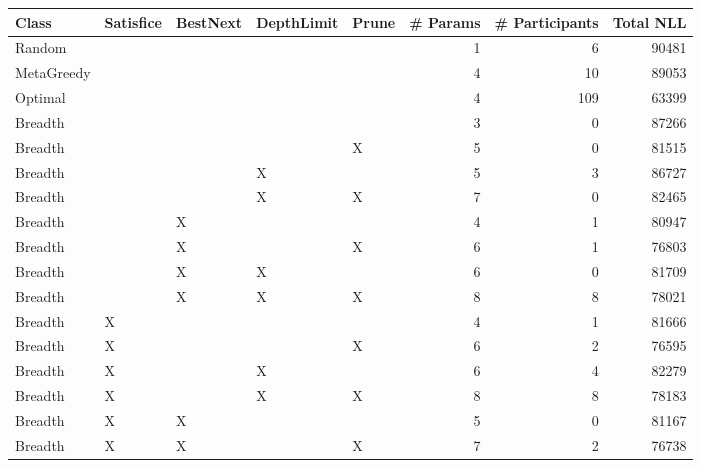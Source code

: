 \begin{tabular}{lllllrrr}
\toprule
      Class & Satisfice & BestNext & DepthLimit & Prune &  \# Params &  \# Participants &  Total NLL \\
\midrule
     Random &           &          &            &       &         1 &               6 &      90481 \\
 MetaGreedy &           &          &            &       &         4 &              10 &      89053 \\
    Optimal &           &          &            &       &         4 &             109 &      63399 \\
    Breadth &           &          &            &       &         3 &               0 &      87266 \\
    Breadth &           &          &            &     X &         5 &               0 &      81515 \\
    Breadth &           &          &          X &       &         5 &               3 &      86727 \\
    Breadth &           &          &          X &     X &         7 &               0 &      82465 \\
    Breadth &           &        X &            &       &         4 &               1 &      80947 \\
    Breadth &           &        X &            &     X &         6 &               1 &      76803 \\
    Breadth &           &        X &          X &       &         6 &               0 &      81709 \\
    Breadth &           &        X &          X &     X &         8 &               8 &      78021 \\
    Breadth &         X &          &            &       &         4 &               1 &      81666 \\
    Breadth &         X &          &            &     X &         6 &               2 &      76595 \\
    Breadth &         X &          &          X &       &         6 &               4 &      82279 \\
    Breadth &         X &          &          X &     X &         8 &               8 &      78183 \\
    Breadth &         X &        X &            &       &         5 &               0 &      81167 \\
    Breadth &         X &        X &            &     X &         7 &               2 &      76738 \\

\end{tabular}
